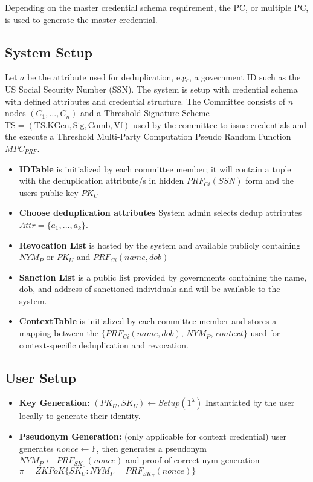 Depending on the master credential schema requirement, the PC, or multiple PC, is used to generate the master credential. 

\subsection{System Setup} 
Let \( a \) be the attribute used for deduplication, e.g., a government ID such as the US Social Security Number (SSN). The system is setup with credential schema with defined attributes and credential structure.
The Committee consists of \( n \) nodes \( (C_1, \ldots, C_n) \) and a Threshold Signature Scheme \( \text{TS} = (\text{TS.KGen}, \text{Sig}, \text{Comb}, \text{Vf}) \) used by the committee to issue credentials and the execute a Threshold Multi-Party Computation Pseudo Random Function $MPC_{PRF}$.

\begin{itemize}
    
    \item \textbf{IDTable} is initialized by each committee member; it will contain a tuple with the deduplication attribute/s in hidden $PRF_{Ci}(SSN)$ form and the users public key $PK_U$
    
    \item \textbf{Choose deduplication attributes} System admin selects dedup attributes $Attr = \{a_1, \ldots, a_k\}$.

    \item \textbf{Revocation List} is hosted by the system and available publicly containing $NYM_P$ or $PK_U$ and $PRF_{Ci}(name, dob)$

    \item \textbf{Sanction List} is a public list provided by governments containing the name, dob, and address of sanctioned individuals and will be available to the system.
    
    \item \textbf{ContextTable} is initialized by each committee member and stores a mapping between the
    $\{PRF_{Ci}(name, dob)$, $NYM_P$, $context\}$
    used for context-specific deduplication and revocation.
    
\end{itemize}

\subsection{User Setup} 

\begin{itemize}

    \item \textbf{Key Generation:} $(PK_U, SK_U) \leftarrow Setup(1^\lambda)$ Instantiated by the user locally to generate their identity.
    
    \item \textbf{Pseudonym Generation:} (only applicable for context credential) user generates $nonce \leftarrow \mathbb{F}$, then generates a pseudonym $NYM_P \leftarrow PRF_{SK_U}(nonce)$
and proof of correct nym generation $\pi = ZKPoK\{SK_U : NYM_P = PRF_{SK_U}(nonce)\}$

\end{itemize}

